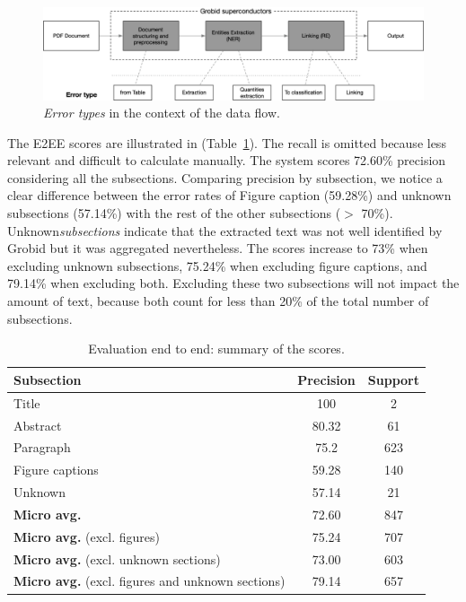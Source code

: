 \documentclass{article}
\begin{document}
\begin{figure}[ht]
\centering
\includegraphics[width=\textwidth]{error-types-3.png}
\caption{\textit{Error types} in the context of the data flow. }
\label{fig:error-types}
\end{figure}

The E2EE scores are illustrated in (Table~\ref{table:end2end-evaluation-summary}). 
The recall is omitted because less relevant and difficult to calculate manually. 
The system scores 72.60\% precision considering all the subsections. 
Comparing precision by subsection, we notice a clear difference between the error rates of Figure caption (59.28\%) and unknown subsections (57.14\%) with the rest of the other subsections ($>$ 70\%). 
Unknown\textit{subsections} indicate that the extracted text was not well identified by Grobid but it was aggregated nevertheless.
The scores increase to 73\% when excluding unknown subsections, 75.24\% when excluding figure captions, and 79.14\%  when excluding both. 
Excluding these two subsections will not impact the amount of text, because both count for less than 20\% of the total number of subsections. 


\begin{table}[ht]
\centering\small
\begin{tabular}{l c c}
\toprule
\textbf{Subsection} & \textbf{Precision} & \textbf{Support} \\ 
\midrule
Title               & 100       & 2     \\
Abstract            & 80.32     & 61    \\
Paragraph           & 75.2      & 623   \\    
Figure captions     & 59.28     & 140   \\    
Unknown             & 57.14     & 21    \\
\midrule
\textbf{Micro avg.}  & 72.60     & 847   \\
\textbf{Micro avg.} (excl. figures)  & 75.24     & 707   \\ 
\textbf{Micro avg.} (excl. unknown sections)  & 73.00     & 603   \\ 
\textbf{Micro avg.} (excl. figures and unknown sections)  & 79.14     & 657   \\ 
\bottomrule
\end{tabular}
\caption{Evaluation end to end: summary of the scores. }
\label{table:end2end-evaluation-summary}
\end{table}
\end{document}
